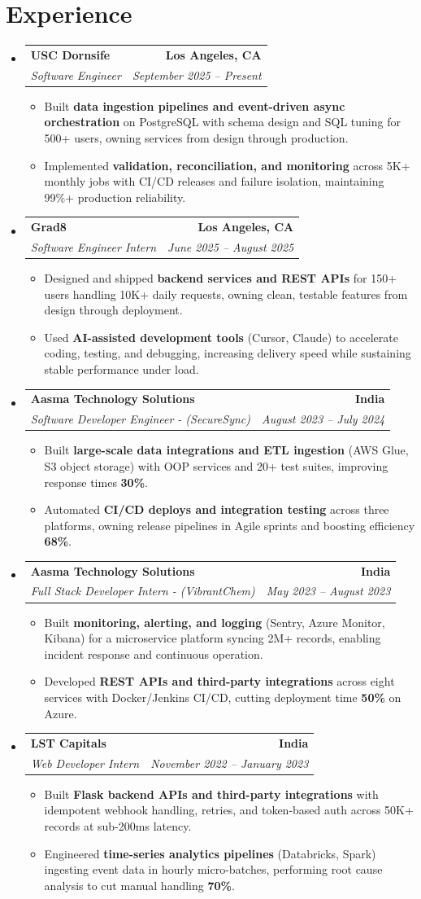 \documentclass[letterpaper,10pt]{article}
\makeatletter
\newcommand{\resumeItem}[1]{\item\small{{#1 \vspace{-2pt}}}}
\newcommand{\resumeSubheading}[4]{\vspace{-1pt}\item\begin{tabular*}{1.0\textwidth}[t]{l@{\extracolsep{\fill}}r}\textbf{#1} & \textbf{\small #2} \\\textit{\small#3} & \textit{\small #4} \\\end{tabular*}\vspace{-2pt}}
\newcommand{\resumeSubHeadingListStart}{\begin{itemize}[leftmargin=0.0in, label={}]}
\newcommand{\resumeSubHeadingListEnd}{\end{itemize}}
\newcommand{\resumeItemListStart}{\begin{itemize}[leftmargin=0.15in,label=\textbullet,itemsep=2pt,topsep=0pt,parsep=0pt,partopsep=0pt]}
\newcommand{\resumeItemListEnd}{\end{itemize}\vspace{-4pt}}
\makeatother
\begin{document}
\section{Experience}
\resumeSubHeadingListStart
\resumeSubheading{USC Dornsife}{Los Angeles, CA}{Software Engineer}{September 2025 -- Present}
\resumeItemListStart
\resumeItem{Built \textbf{data ingestion pipelines and event-driven async orchestration} on PostgreSQL with schema design and SQL tuning for 500+ users, owning services from design through production.}
\resumeItem{Implemented \textbf{validation, reconciliation, and monitoring} across 5K+ monthly jobs with CI/CD releases and failure isolation, maintaining 99\%+ production reliability.}
\resumeItemListEnd
\resumeSubheading{Grad8}{Los Angeles, CA}{Software Engineer Intern}{June 2025 -- August 2025}
\resumeItemListStart
\resumeItem{Designed and shipped \textbf{backend services and REST APIs} for 150+ users handling 10K+ daily requests, owning clean, testable features from design through deployment.}
\resumeItem{Used \textbf{AI-assisted development tools} (Cursor, Claude) to accelerate coding, testing, and debugging, increasing delivery speed while sustaining stable performance under load.}
\resumeItemListEnd
\resumeSubheading{Aasma Technology Solutions}{India}{Software Developer Engineer - (SecureSync)}{August 2023 -- July 2024}
\resumeItemListStart
\resumeItem{Built \textbf{large-scale data integrations and ETL ingestion} (AWS Glue, S3 object storage) with OOP services and 20+ test suites, improving response times \textbf{30\%}.}
\resumeItem{Automated \textbf{CI/CD deploys and integration testing} across three platforms, owning release pipelines in Agile sprints and boosting efficiency \textbf{68\%}.}
\resumeItemListEnd
\resumeSubheading{Aasma Technology Solutions}{India}{Full Stack Developer Intern - (VibrantChem)}{May 2023 -- August 2023}
\resumeItemListStart
\resumeItem{Built \textbf{monitoring, alerting, and logging} (Sentry, Azure Monitor, Kibana) for a microservice platform syncing 2M+ records, enabling incident response and continuous operation.}
\resumeItem{Developed \textbf{REST APIs and third-party integrations} across eight services with Docker/Jenkins CI/CD, cutting deployment time \textbf{50\%} on Azure.}
\resumeItemListEnd
\resumeSubheading{LST Capitals}{India}{Web Developer Intern}{November 2022 -- January 2023}
\resumeItemListStart
\resumeItem{Built \textbf{Flask backend APIs and third-party integrations} with idempotent webhook handling, retries, and token-based auth across 50K+ records at sub-200ms latency.}
\resumeItem{Engineered \textbf{time-series analytics pipelines} (Databricks, Spark) ingesting event data in hourly micro-batches, performing root cause analysis to cut manual handling \textbf{70\%}.}
\resumeItemListEnd
\resumeSubHeadingListEnd
\vspace{-6pt}
\end{document}
